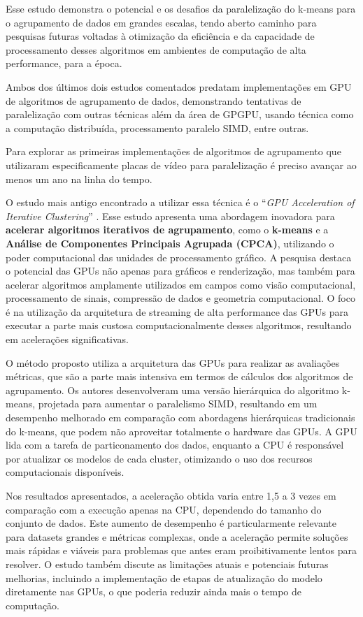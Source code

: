 \documentclass[12pt,
openright, 
oneside, %
a4paper,    %
brazil]{facom-ufu-abntex2}
\begin{document}
Esse estudo demonstra o potencial e os desafios da paralelização do k-means para o agrupamento de dados em grandes escalas, tendo aberto caminho para pesquisas futuras voltadas à otimização da eficiência e da capacidade de processamento desses algoritmos em ambientes de computação de alta performance, para a época.

Ambos dos últimos dois estudos comentados predatam implementações em GPU de algoritmos de agrupamento de dados, demonstrando tentativas de paralelização com outras técnicas além da área de GPGPU, usando técnica como a computação distribuída, processamento paralelo SIMD, entre outras.

Para explorar as primeiras implementações de algoritmos de agrupamento que utilizaram especificamente placas de vídeo para paralelização é preciso avançar ao menos um ano na linha do tempo.

O estudo mais antigo encontrado a utilizar essa técnica é o \enquote{\textit{GPU Acceleration of Iterative Clustering}} \cite{iterativeClusteringGPU2004}. Esse estudo apresenta uma abordagem inovadora para \textbf{acelerar algoritmos iterativos de agrupamento}, como o \textbf{k-means} e a \textbf{Análise de Componentes Principais Agrupada (CPCA)}, utilizando o poder computacional das unidades de processamento gráfico. A pesquisa destaca o potencial das GPUs não apenas para gráficos e renderização, mas também para acelerar algoritmos amplamente utilizados em campos como visão computacional, processamento de sinais, compressão de dados e geometria computacional. O foco é na utilização da arquitetura de streaming de alta performance das GPUs para executar a parte mais custosa computacionalmente desses algoritmos, resultando em acelerações significativas.

O método proposto utiliza a arquitetura das GPUs para realizar as avaliações métricas, que são a parte mais intensiva em termos de cálculos dos algoritmos de agrupamento. Os autores desenvolveram uma versão hierárquica do algoritmo k-means, projetada para aumentar o paralelismo SIMD, resultando em um desempenho melhorado em comparação com abordagens hierárquicas tradicionais do k-means, que podem não aproveitar totalmente o hardware das GPUs. A GPU lida com a tarefa de particonamento dos dados, enquanto a CPU é responsável por atualizar os modelos de cada cluster, otimizando o uso dos recursos computacionais disponíveis.

Nos resultados apresentados, a aceleração obtida varia entre 1,5 a 3 vezes em comparação com a execução apenas na CPU, dependendo do tamanho do conjunto de dados. Este aumento de desempenho é particularmente relevante para datasets grandes e métricas complexas, onde a aceleração permite soluções mais rápidas e viáveis para problemas que antes eram proibitivamente lentos para resolver. O estudo também discute as limitações atuais e potenciais futuras melhorias, incluindo a implementação de etapas de atualização do modelo diretamente nas GPUs, o que poderia reduzir ainda mais o tempo de computação.
\end{document}

